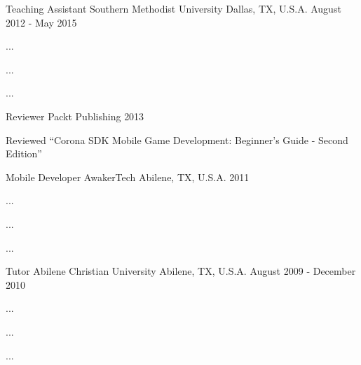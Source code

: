 

\begin{cventries}

  \cventry
    {Teaching Assistant} %
    {Southern Methodist University} %
    {Dallas, TX, U.S.A.} %
    {August 2012 - May 2015} %
    {
      \begin{cvitems} %
        \item {...}
        \item {...}
        \item {...}
      \end{cvitems}
    }

  \cventry
    {Reviewer} %
    {Packt Publishing} %
    {} %
    {2013} %
    {
      \begin{cvitems} %
        \item {Reviewed ``Corona SDK Mobile Game Development: Beginner's Guide - Second Edition''}
      \end{cvitems}
    }

  \cventry
    {Mobile Developer} %
    {AwakerTech} %
    {Abilene, TX, U.S.A.} %
    {2011} %
    {
      \begin{cvitems} %
        \item {...}
        \item {...}
        \item {...}
      \end{cvitems}
    }

  \cventry
    {Tutor} %
    {Abilene Christian University} %
    {Abilene, TX, U.S.A.} %
    {August 2009 - December 2010} %
    {
      \begin{cvitems} %
        \item {...}
        \item {...}
        \item {...}
      \end{cvitems}
    }

\end{cventries}
